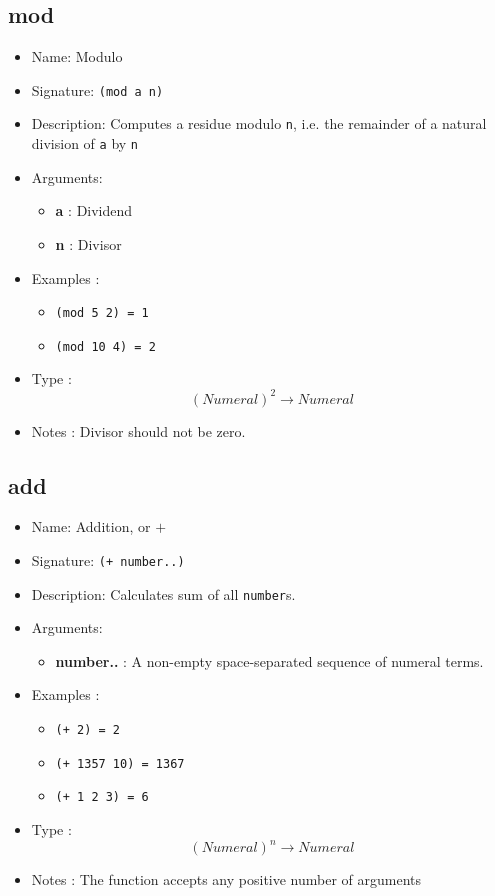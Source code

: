 \subsection{mod}
\begin{itemize}
    \item Name: Modulo
    \item Signature: \texttt{(mod a n)}
    \item Description: Computes a residue modulo \texttt{n}, i.e. the remainder of a natural division of \texttt{a} by \texttt{n}
    \item Arguments:
        \begin{itemize}
            \item \textbf{a} : Dividend
            \item \textbf{n} : Divisor
        \end{itemize}
    \item Examples :
        \begin{itemize}
            \item \texttt{(mod 5 2) = 1}
            \item \texttt{(mod 10 4) = 2}
        \end{itemize}
    \item Type : \[(Numeral)^2 \to Numeral\]
    \item Notes : Divisor should not be zero.
\end{itemize}

\subsection{add}
\begin{itemize}
    \item Name: Addition, or $+$
    \item Signature: \texttt{(+ number..)}
    \item Description: Calculates sum of all \texttt{number}s.
    \item Arguments:
        \begin{itemize}
            \item \textbf{number..} : A non-empty space-separated sequence of numeral terms.
        \end{itemize}
    \item Examples :
        \begin{itemize}
            \item \texttt{(+ 2) = 2}
            \item \texttt{(+ 1357 10) = 1367}
            \item \texttt{(+ 1 2 3) = 6}
        \end{itemize}
    \item Type : \[(Numeral)^n \to Numeral\]
    \item Notes : The function accepts any positive number of arguments
\end{itemize}

